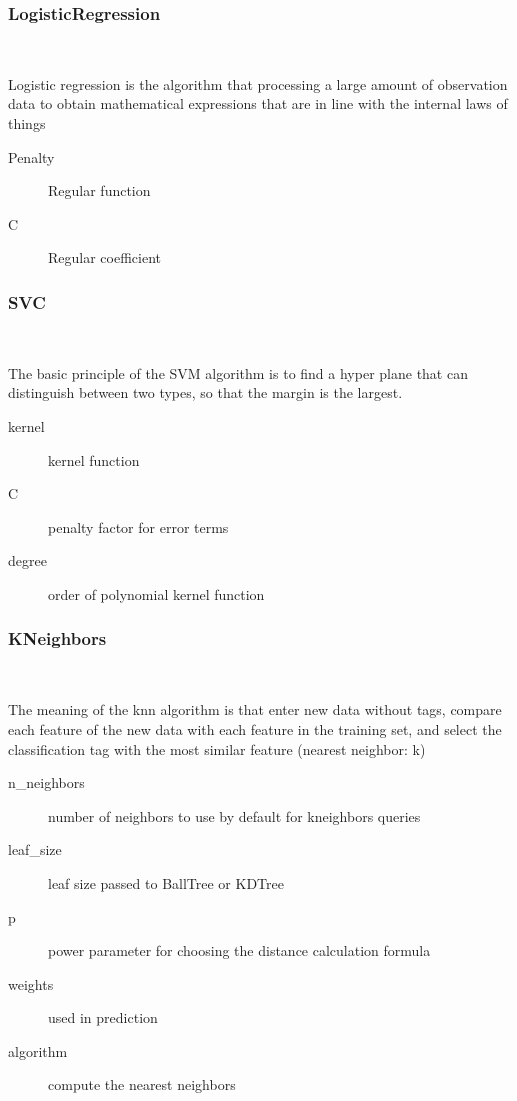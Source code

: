 \subsubsection{LogisticRegression}
\

Logistic regression is the algorithm that 
processing a large amount of 
observation data to 
obtain mathematical expressions 
that are in line with 
the internal laws of things
	
	
\begin{description}
	\item[Penalty] Regular function
	\item[C] Regular coefficient
\end{description}
	


\subsubsection{SVC}
\

The basic principle of the SVM algorithm is 
to find a hyper plane that can 
distinguish between two types, 
so that the margin is the largest.


\begin{description}
	\item[kernel] kernel function
	\item[C] penalty factor for error terms
	\item[degree] order of polynomial kernel function
\end{description}
	
\subsubsection{KNeighbors}
\

The meaning of the knn algorithm is that 
enter new data without tags, 
compare each feature of the new data with 
each feature in the training set, 
and select the classification tag with 
the most similar feature (nearest neighbor: k)


\begin{description}
	\item[n_neighbors] number of neighbors to use 
	by default for kneighbors queries
	\item[leaf_size] leaf size passed to BallTree or KDTree
	\item[p] power parameter for choosing 
	the distance calculation formula
	\item[weights] used in prediction
	\item[algorithm] compute the nearest neighbors
	\end{description}
	
